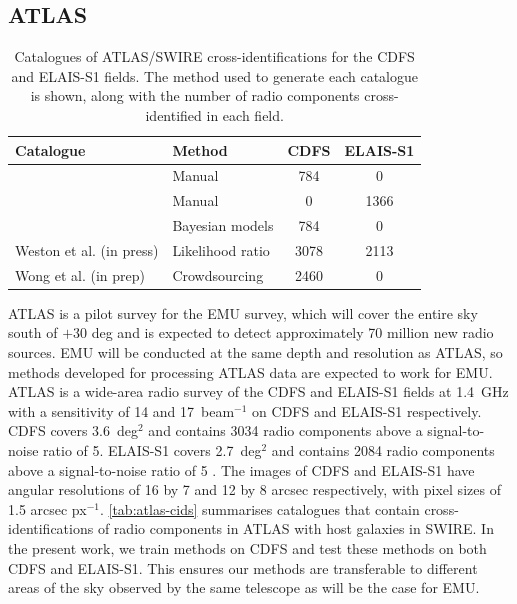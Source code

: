 \documentclass[fleqn,usenatbib,usedcolumn]{mnras}
\newcommand{\jansky}{\text{Jy}}
\begin{document}
  \subsection{ATLAS}\label{sec:atlas}
    \begin{table}
      \caption{Catalogues of ATLAS/SWIRE cross-identifications for the CDFS
        and ELAIS-S1 fields. The method used to generate each catalogue is
        shown, along with the number of radio components cross-identified in each
        field.}
      \label{tab:atlas-cids}
      \begin{tabular}{llcc}
        \hline
        Catalogue & Method & CDFS & ELAIS-S1\\
        \hline
        \citet{norris06} & Manual & 784 & 0\\
        \citet{middelberg08} & Manual & 0 & 1366\\
        \citet{fan15} & Bayesian models & 784 & 0\\
        Weston et al. (in press) & Likelihood ratio & 3078 & 2113\\
        Wong et al. (in prep) & Crowdsourcing & 2460 & 0 \\
        \hline
      \end{tabular}
    \end{table}

    ATLAS is a pilot survey for the EMU \citep{norris11} survey, which will
    cover the entire sky south of $+30$ deg and is expected to
    detect approximately 70 million new radio sources. EMU will be conducted
    at the same depth and resolution as ATLAS, so methods developed for
    processing ATLAS data are expected to work for EMU. ATLAS is a wide-area
    radio survey of the CDFS and ELAIS-S1 fields at 1.4~GHz with a sensitivity
    of 14 and \unit{17}{\micro\jansky}~beam$^{-1}$ on CDFS and ELAIS-S1 respectively. CDFS
    covers 3.6~deg$^2$ and contains 3034 radio components above a signal-to-noise ratio of 5.
    ELAIS-S1 covers 2.7~deg$^2$ and contains 2084 radio components above a signal-to-noise ratio of 5 \citep{franzen15}. The images of CDFS and ELAIS-S1 have angular resolutions of 16 by 7 and 12 by 8 arcsec respectively, with pixel sizes of 1.5 arcsec px$^{-1}$. \autoref{tab:atlas-cids} summarises
    catalogues that contain cross-identifications of radio components in ATLAS with host
    galaxies in SWIRE. In the present work, we train methods on CDFS and test these methods on both CDFS and ELAIS-S1.  This ensures our methods are transferable to different areas of the sky observed by the same telescope as will be the case for EMU.
\end{document}
